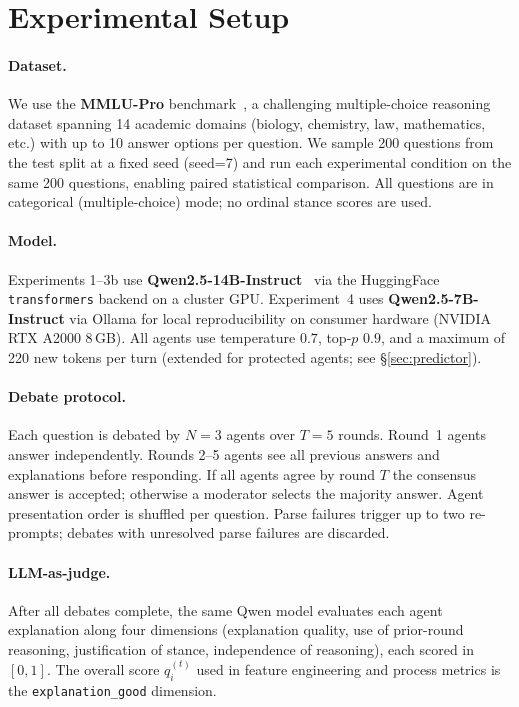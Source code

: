 \section{Experimental Setup}
\label{sec:experiments}

\paragraph{Dataset.}
We use the \textbf{MMLU-Pro} benchmark~\cite{mmlupro}, a challenging
multiple-choice reasoning dataset spanning 14 academic domains (biology,
chemistry, law, mathematics, etc.) with up to 10 answer options per
question.
We sample 200 questions from the test split at a fixed seed (seed=7)
and run each experimental condition on the same 200 questions, enabling
paired statistical comparison.
All questions are in categorical (multiple-choice) mode; no ordinal stance
scores are used.

\paragraph{Model.}
Experiments 1--3b use \textbf{Qwen2.5-14B-Instruct}~\cite{qwen25} via the
HuggingFace \texttt{transformers} backend on a cluster GPU.
Experiment~4 uses \textbf{Qwen2.5-7B-Instruct} via Ollama for local
reproducibility on consumer hardware (NVIDIA RTX A2000 8\,GB).
All agents use temperature $0.7$, top-$p$ $0.9$, and a maximum of 220
new tokens per turn (extended for protected agents; see \S\ref{sec:predictor}).

\paragraph{Debate protocol.}
Each question is debated by $N\!=\!3$ agents over $T\!=\!5$ rounds.
Round~1 agents answer independently.
Rounds 2--5 agents see all previous answers and explanations before
responding.
If all agents agree by round $T$ the consensus answer is accepted; otherwise
a moderator selects the majority answer.
Agent presentation order is shuffled per question.
Parse failures trigger up to two re-prompts; debates with unresolved parse
failures are discarded.

\paragraph{LLM-as-judge.}
After all debates complete, the same Qwen model evaluates each agent
explanation along four dimensions (explanation quality, use of prior-round
reasoning, justification of stance, independence of reasoning), each scored
in $[0,1]$.
The overall score $q_i^{(t)}$ used in feature engineering and process
metrics is the \texttt{explanation\_good} dimension.

